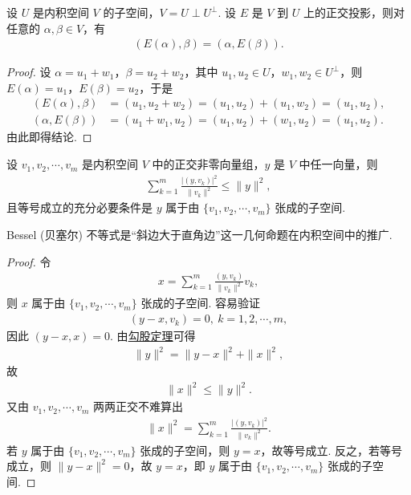 \documentclass[../../main.tex]{subfiles}
\begin{document}
\begin{proposition}\label{proposition:正交投影的性质}
设 $U$ 是内积空间 $V$ 的子空间，$V = U \perp U^\perp$. 设 $E$ 是 $V$ 到 $U$ 上的正交投影，则对任意的 $\alpha, \beta \in V$，有
\begin{align*}
(E(\alpha), \beta) = (\alpha, E(\beta)).
\end{align*}
\end{proposition}
\begin{proof}
设 $\alpha = u_1 + w_1$，$\beta = u_2 + w_2$，其中 $u_1, u_2 \in U$，$w_1, w_2 \in U^\perp$，则 $E(\alpha) = u_1$，$E(\beta) = u_2$，于是
\begin{align*}
(E(\alpha), \beta) &= (u_1, u_2 + w_2) = (u_1, u_2) + (u_1, w_2) = (u_1, u_2), \\
(\alpha, E(\beta)) &= (u_1 + w_1, u_2) = (u_1, u_2) + (w_1, u_2) = (u_1, u_2).
\end{align*}
由此即得结论.

\end{proof}

\begin{proposition}\label{proposition:Bessel不等式}
设 $v_1, v_2, \cdots, v_m$ 是内积空间 $V$ 中的正交非零向量组，$y$ 是 $V$ 中任一向量，则
\begin{align*}
\sum_{k = 1}^{m}\frac{|(y, v_k)|^2}{\|v_k\|^2} \leqslant  \|y\|^2,
\end{align*}
且等号成立的充分必要条件是 $y$ 属于由 $\{v_1, v_2, \cdots, v_m\}$ 张成的子空间.
\end{proposition}
\begin{remark}
Bessel (贝塞尔) 不等式是“斜边大于直角边”这一几何命题在内积空间中的推广.
\end{remark}
\begin{proof}
令
\begin{align*}
x = \sum_{k = 1}^{m}\frac{(y, v_k)}{\|v_k\|^2}v_k,
\end{align*}
则 $x$ 属于由 $\{v_1, v_2, \cdots, v_m\}$ 张成的子空间. 容易验证
\begin{align*}
(y - x, v_k) = 0, \ k = 1, 2, \cdots, m,
\end{align*}
因此 $(y - x, x) = 0$. 由\hyperref[corollary:范数性质的相关推广-勾股定理]{勾股定理}可得
\begin{align*}
\|y\|^2 = \|y - x\|^2 + \|x\|^2,
\end{align*}
故
\begin{align*}
\|x\|^2 \leqslant  \|y\|^2.
\end{align*}
又由 $v_1, v_2, \cdots, v_m$ 两两正交不难算出
\begin{align*}
\|x\|^2 = \sum_{k = 1}^{m}\frac{|(y, v_k)|^2}{\|v_k\|^2}.
\end{align*}
若 $y$ 属于由 $\{v_1, v_2, \cdots, v_m\}$ 张成的子空间，则 $y = x$，故等号成立. 反之，若等号成立，则 $\|y - x\|^2 = 0$，故 $y = x$，即 $y$ 属于由 $\{v_1, v_2, \cdots, v_m\}$ 张成的子空间. 

\end{proof}
\end{document}

